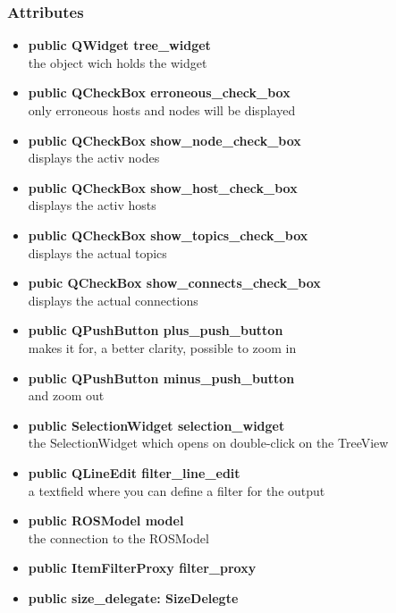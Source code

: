 \subsubsection{Attributes}
\begin{itemize}
  \item \textbf{public QWidget tree\_widget}\\
  the object wich holds the widget
  \item \textbf{public QCheckBox erroneous\_check\_box}\\
  only erroneous hosts and nodes will be displayed
  \item \textbf{public QCheckBox show\_node\_check\_box}\\
  displays the activ nodes
  \item \textbf{public QCheckBox show\_host\_check\_box}\\
  displays the activ hosts
  \item \textbf{public QCheckBox show\_topics\_check\_box}\\
  displays the actual topics
  \item \textbf{pubic QCheckBox show\_connects\_check\_box}\\
  displays the actual connections
  \item \textbf{public QPushButton plus\_push\_button}\\
  makes it for, a better clarity, possible to zoom in  
  \item \textbf{public QPushButton minus\_push\_button}\\
  and zoom out
  \item \textbf{public SelectionWidget selection\_widget}\\
  the SelectionWidget which opens on double-click on the TreeView
  \item \textbf{public QLineEdit filter\_line\_edit}\\
  a textfield where you can define a filter for the output
  \item \textbf{public ROSModel model}\\
  the connection to the ROSModel
  \item \textbf{public ItemFilterProxy filter\_proxy}\\
  
  \item \textbf{public size\_delegate: SizeDelegte}\\
  
\end{itemize}
